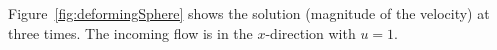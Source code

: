 Figure~\ref{fig:deformingSphere} shows the solution (magnitude of the velocity) at three times. 
The incoming flow is in the $x$-direction with $u=1$.



